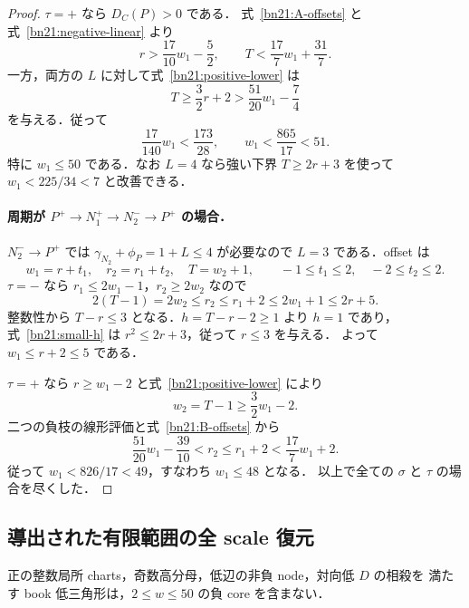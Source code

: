 \begin{proof}
$\tau=+$ なら $D_C(P)>0$ である．
式~\eqref{bn21:A-offsets} と式~\eqref{bn21:negative-linear} より
\[
 r>\frac{17}{10}w_1-\frac52,\qquad
 T<\frac{17}{7}w_1+\frac{31}{7}.
\]
一方，両方の $L$ に対して式~\eqref{bn21:positive-lower} は
\[
 T\ge\frac32r+2>\frac{51}{20}w_1-\frac74
\]
を与える．従って
\begin{equation}\label{bn21:A-bound}
 \frac{17}{140}w_1<\frac{173}{28},\qquad
 w_1<\frac{865}{17}<51.
\end{equation}
特に $w_1\le50$ である．なお $L=4$ なら強い下界
$T\ge2r+3$ を使って $w_1<225/34<7$ と改善できる．

\paragraph{周期が $P^+\to N_1^+\to N_2^-\to P^+$ の場合．}
$N_2^-\to P^+$ では $\gamma_{N_2}+\phi_P=1+L\le4$ が必要なので
$L=3$ である．offset は
\begin{equation}\label{bn21:B-offsets}
 w_1=r+t_1,\quad r_2=r_1+t_2,\quad T=w_2+1,
 \qquad-1\le t_1\le2,\quad-2\le t_2\le2.
\end{equation}
$\tau=-$ なら $r_1\le2w_1-1$，$r_2\ge2w_2$ なので
\[
 2(T-1)=2w_2\le r_2\le r_1+2\le2w_1+1\le2r+5.
\]
整数性から $T-r\le3$ となる．$h=T-r-2\ge1$ より $h=1$ であり，
式~\eqref{bn21:small-h} は $r^2\le2r+3$，従って $r\le3$ を与える．
よって $w_1\le r+2\le5$ である．

$\tau=+$ なら $r\ge w_1-2$ と式~\eqref{bn21:positive-lower} により
\[
 w_2=T-1\ge\frac32w_1-2.
\]
二つの負枝の線形評価と式~\eqref{bn21:B-offsets} から
\[
 \frac{51}{20}w_1-\frac{39}{10}<r_2
 \le r_1+2<\frac{17}{7}w_1+2.
\]
従って $w_1<826/17<49$，すなわち $w_1\le48$ となる．
以上で全ての $\sigma$ と $\tau$ の場合を尽くした．
\end{proof}

\subsection{導出された有限範囲の全 scale 復元}

\begin{lemma}
\label{bn21:finite-certificate}
正の整数局所 charts，奇数高分母，低辺の非負 node，対向低 $D$ の相殺を
満たす book 低三角形は，$2\le w\le50$ の負 core を含まない．
\end{lemma}

